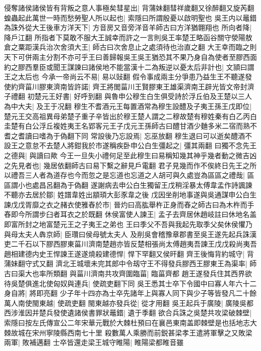 侵奪諸侯諸侯皆有背叛之意人事極矣彗星出|{
	背蒲妹翻彗祥歲翻又徐醉翻又旋芮翻}
蝗蟲起此萬世一時而愁勞聖人所以起也|{
	索隱曰所謂殷憂以啟明聖也}
吳王内以鼂錯為誅外從大王後車方洋天下|{
	方音房又音旁洋音羊師古曰方洋猶翺翔也}
所向者降|{
	降戶江翻}
所指者下莫敢不服大王誠幸而許之一言則吳王率楚王略函谷關守滎陽敖倉之粟距漢兵治次舍須大王|{
	師古曰次舍息止之處須待也治直之翻}
大王幸而臨之則天下可併兩主分割不亦可乎王曰善歸報吳王吳王猶恐其不果乃身自為使者至膠西面約之膠西羣臣或聞王謀諫曰諸侯地不能當漢十二為叛逆以憂太后非計也|{
	文頴曰謂王之太后也}
今承一帝尚云不易|{
	易以䜴翻}
假令事成兩主分爭患乃益生王不聽遂發使約齊菑川膠東濟南皆許諾|{
	齊王將閭菑川王賢膠東王雄渠濟南王辟光皆文帝封濟子禮翻}
初楚元王好書|{
	好呼到翻}
與魯申公穆生白生俱受詩於浮丘伯及王楚以三人為中大夫|{
	及王于况翻}
穆生不耆酒元王每置酒常為穆生設醴及子夷王孫王戊即位|{
	楚元王交高祖異母弟楚子重子辛皆出於穆王楚人謂之二穆故楚有穆姓秦有白乙丙白圭楚有白公浮丘複姓夷王名郢客元王子戊元王孫師古曰醴甘酒少麯多米二宿而熟不耆之耆讀曰嗜為于偽翻下同}
常設後乃忘設焉|{
	忘巫放翻}
穆生退曰可以逝矣醴酒不設王之意怠不去楚人將鉗我於市遂稱疾卧申公白生彊起之|{
	彊其兩翻}
曰獨不念先王之德與|{
	與讀曰歟}
今王一旦失小禮何足至此穆生曰易稱知幾其神乎幾者動之微吉凶之先見者也|{
	幾居依翻師古曰易下繫之辭見戶電翻}
君子見幾而作不俟終日先王之所以禮吾三人者為道存也今而忽之是忘道也忘道之人胡可與久處豈為區區之禮哉|{
	區區謂小也處昌呂翻為于偽翻}
遂謝病去申公白生獨留王戊稍淫暴太傅韋孟作詩諷諫不聽亦去居於鄒|{
	姓譜韋姓出顓頊大彭豕韋之後}
戊因坐削地事遂與吳通謀申公白生諫戊戊胥靡之衣之赭衣使雅舂於市|{
	晉灼曰高肱舉杵正身而舂之師古曰為木杵而手舂即今所謂步臼者耳衣之於既翻}
休侯富使人諫王|{
	孟子去齊居休趙岐註曰休地名盖即富所封之地富楚元王之子夷王之弟也}
王曰季父不吾與我起先取季父矣休侯懼乃與母太夫人犇京師|{
	臣瓚曰侯母號太夫人}
及削吳會稽豫章郡書至吳王遂先起兵誅漢吏二千石以下膠西膠東菑川濟南楚趙亦皆反楚相張尚太傅趙夷吾諫王戊戊殺尚夷吾趙相建德内史王悍諫王遂遂燒殺建德悍|{
	悍下罕翻又侯旰翻}
齊王後悔背約城守|{
	背蒲妹翻守式又翻}
濟北王城壞未完其郎中令刼守王不得發兵膠西王膠東王為渠率|{
	師古曰渠大也率所類翻}
與菑川濟南共攻齊圍臨菑|{
	臨菑齊都}
趙王遂發兵住其西界欲待吳楚俱進北使匈奴與連兵|{
	使疏吏翻下同}
吳王悉其士卒下令國中曰寡人年六十二身自將|{
	將即亮翻}
少子年十四亦為士卒先諸年上與寡人同下與少子等皆發凡二十餘萬人南使閩東越|{
	使疏吏翻}
閩東越亦發兵從|{
	從才用翻}
吳王起兵于廣陵|{
	廣陵吳都}
西涉淮因并楚兵發使遺諸侯書罪狀鼂錯|{
	遺于季翻}
欲合兵誅之吳楚共攻梁破棘壁|{
	索隱曰按左氏傳宣公二年宋華元戰於大棘杜預曰在襄邑東南盖即棘壁是也括地志大棘故城在宋州寧陵縣西南七十里}
殺數萬人乘勝而前鋭甚梁孝王遣將軍擊之又敗梁兩軍|{
	敗補邁翻}
士卒皆還走梁王城守睢陽|{
	睢陽梁都睢音雖}
